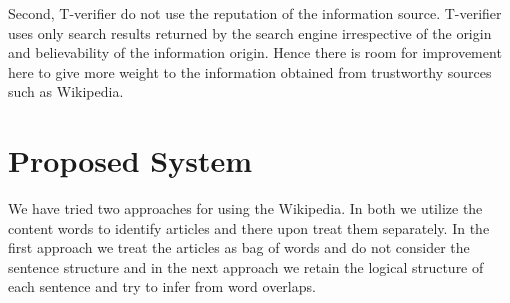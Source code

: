 \documentclass[12pt]{article}
\begin{document}
Second, T-verifier do not use the reputation of the information source.
T-verifier uses only search results returned by the search engine irrespective of
the origin and believability of the information origin. Hence there is room for
improvement here to give more weight to the information obtained from trustworthy
sources such as Wikipedia.


\section{Proposed System}
\label{sec:UseOfWikipedia}
We have tried two approaches for using the Wikipedia. In both we utilize the content words to identify articles and there upon treat them separately. In the first approach we treat the articles as bag of words and do not consider the sentence structure and in the next approach we retain the logical structure of each sentence and try to infer from word overlaps.
 

\label{Mar29toApr12}
\end{document}
